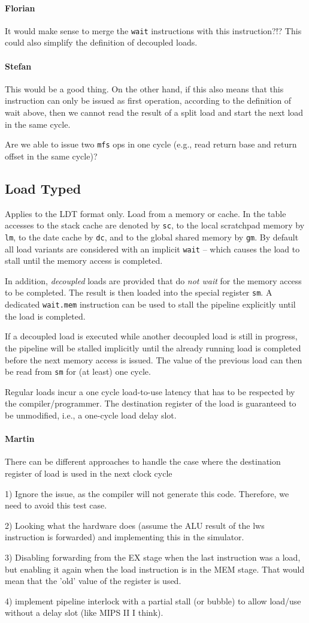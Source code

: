 \documentclass{IEEEtran}
\newcommand{\comment}[3]{\paragraph*{\textbf{#1}}{\color{#3}#2}}
\newcommand{\martin}[1]{\comment{Martin}{#1}{Blue}}
\newcommand{\stefan}[1]{\comment{Stefan}{#1}{RoyalPurple}}
\newcommand{\fb}[1]{\comment{Florian}{#1}{Emerald}}
\begin{document}
\fb{It would make sense to merge the \texttt{wait} instructions with this
    instruction?!? This could also simplify the definition of decoupled loads.}

\stefan{This would be a good thing.
On the other hand, if this also means that this instruction can only be issued as first operation, according to the definition of wait
above, then we cannot read the result of a split load and start the next load in the same cycle.

Are we able to issue two \texttt{mfs} ops in one cycle (e.g., read return base and return offset in the same cycle)?}

\vspace{5mm}
\subsection{Load Typed}
\label{subsec:load_typed}

Applies to the LDT format only. Load from a memory or
cache. In the table accesses to the stack cache are denoted by \texttt{sc}, to
the local scratchpad memory by \texttt{lm}, to the date cache by \texttt{dc},
and to the global shared memory by \texttt{gm}. By default all load variants are
considered with an implicit \texttt{wait} -- which causes the load to stall
until the memory access is completed.

In addition, \emph{decoupled} loads are provided that do \emph{not wait} for the
memory access to be completed. The result is then loaded into the special
register \texttt{sm}. A dedicated \texttt{wait.mem} instruction can be used to
stall the pipeline explicitly until the load is completed.

If a decoupled load is executed while another decoupled load is still in
progress, the pipeline will be stalled implicitly until the already running load
is completed before the next memory access is issued. The value of the previous
load can then be read from \texttt{sm} for (at least) one cycle.

Regular loads incur a one cycle load-to-use latency that has
to be respected by the compiler/programmer. The destination register of the load
is guaranteed to be unmodified, i.e., a one-cycle load delay slot.

\martin{There can be different approaches to handle the case where the destination register of load is used in the next clock cycle

1) Ignore the issue, as the compiler will not generate this code. Therefore, we need to avoid this test case.

2) Looking what the hardware does (assume the ALU result of the lws instruction is forwarded) and implementing this in the simulator.

3) Disabling forwarding from the EX stage when the last instruction was a load, but enabling it again when the load instruction is in the MEM stage. That would mean that the 'old' value of the register is used.

4) implement pipeline interlock with a partial stall (or bubble) to allow load/use without a delay slot (like MIPS II I think).

}
\end{document}
